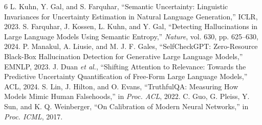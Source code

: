 \documentclass[runningheads]{llncs}
\begin{document}
\begin{thebibliography}{6}
 L. Kuhn, Y. Gal, and S. Farquhar, ``Semantic Uncertainty: Linguistic Invariances for Uncertainty Estimation in Natural Language Generation,'' ICLR, 2023.
 S. Farquhar, J. Kossen, L. Kuhn, and Y. Gal, ``Detecting Hallucinations in Large Language Models Using Semantic Entropy,'' \emph{Nature}, vol. 630, pp. 625--630, 2024.
 P. Manakul, A. Liusie, and M. J. F. Gales, ``SelfCheckGPT: Zero-Resource Black-Box Hallucination Detection for Generative Large Language Models,'' EMNLP, 2023.
 J. Duan \emph{et al.}, ``Shifting Attention to Relevance: Towards the Predictive Uncertainty Quantification of Free-Form Large Language Models,'' ACL, 2024.
 S. Lin, J. Hilton, and O. Evans, ``TruthfulQA: Measuring How Models Mimic Human Falsehoods,'' in \emph{Proc. ACL}, 2022.
 C. Guo, G. Pleiss, Y. Sun, and K. Q. Weinberger, ``On Calibration of Modern Neural Networks,'' in \emph{Proc. ICML}, 2017.
\end{thebibliography}
\end{document}
